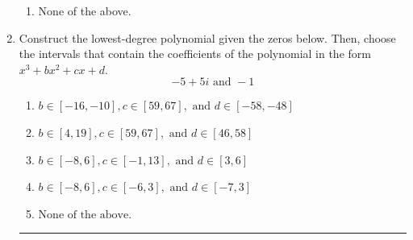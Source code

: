 \documentclass[14pt]{extbook}
\newcommand{\litem}[1]{\item#1\hspace*{-1cm}\rule{\textwidth}{0.4pt}}
\begin{document}
\begin{enumerate}
{\begin{enumerate}[label=\Alph*.]
\item None of the above.
\end{enumerate} }
\litem{
Construct the lowest-degree polynomial given the zeros below. Then, choose the intervals that contain the coefficients of the polynomial in the form $x^3+bx^2+cx+d$.\[ -5 + 5 i \text{ and } -1 \]\begin{enumerate}[label=\Alph*.]
\item \( b \in [-16, -10], c \in [59, 67], \text{ and } d \in [-58, -48] \)
\item \( b \in [4, 19], c \in [59, 67], \text{ and } d \in [46, 58] \)
\item \( b \in [-8, 6], c \in [-1, 13], \text{ and } d \in [3, 6] \)
\item \( b \in [-8, 6], c \in [-6, 3], \text{ and } d \in [-7, 3] \)
\item \( \text{None of the above.} \)


\end{enumerate}}
\end{enumerate}
\end{document}
